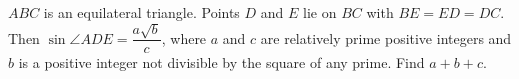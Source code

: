 \(ABC\) is an equilateral triangle. Points \(D\) and \(E\) lie on \(BC\) with \(BE=ED=DC\). Then \(\sin\angle ADE=\dfrac{a\sqrt b}{c}\), where \(a\) and \(c\) are relatively prime positive integers and \(b\) is a positive integer not divisible by the square of any prime. Find \(a+b+c\).
